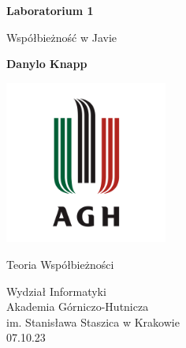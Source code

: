 \documentclass[12pt]{article}
\begin{document}
\begin{titlepage}
    \begin{center}
        \vspace*{1cm}
 
        \textbf{Laboratorium 1}
 
        \vspace{0.5cm}
        Współbieżność w Javie
             
        \vspace{1.5cm}
 
        \textbf{Danylo Knapp}

        \vfill

        \includegraphics[width=0.4\textwidth]{agh-logo.png}
 
        \vfill
             
        Teoria Współbieżności
             
        \vspace{0.8cm}

        Wydział Informatyki\\
        Akademia Górniczo-Hutnicza\\
        im. Stanisława Staszica w Krakowie\\
        07.10.23
             
    \end{center}
\end{titlepage}
\end{document}
